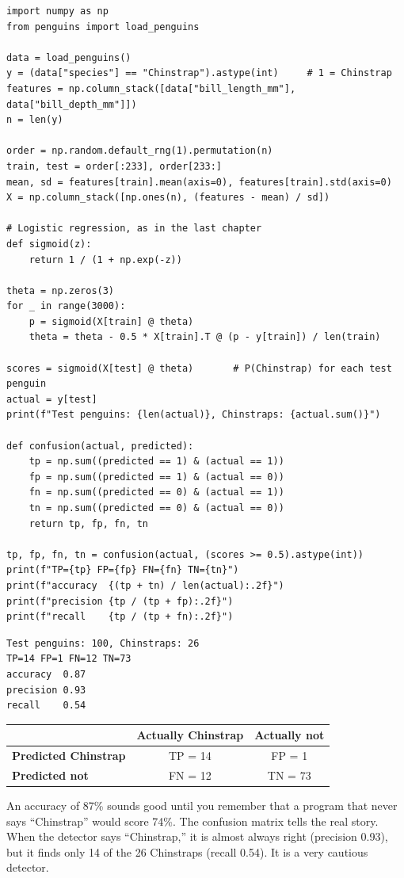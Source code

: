 \begin{verbatim}
import numpy as np
from penguins import load_penguins

data = load_penguins()
y = (data["species"] == "Chinstrap").astype(int)     # 1 = Chinstrap
features = np.column_stack([data["bill_length_mm"], data["bill_depth_mm"]])
n = len(y)

order = np.random.default_rng(1).permutation(n)
train, test = order[:233], order[233:]
mean, sd = features[train].mean(axis=0), features[train].std(axis=0)
X = np.column_stack([np.ones(n), (features - mean) / sd])

# Logistic regression, as in the last chapter
def sigmoid(z):
    return 1 / (1 + np.exp(-z))

theta = np.zeros(3)
for _ in range(3000):
    p = sigmoid(X[train] @ theta)
    theta = theta - 0.5 * X[train].T @ (p - y[train]) / len(train)

scores = sigmoid(X[test] @ theta)       # P(Chinstrap) for each test penguin
actual = y[test]
print(f"Test penguins: {len(actual)}, Chinstraps: {actual.sum()}")

def confusion(actual, predicted):
    tp = np.sum((predicted == 1) & (actual == 1))
    fp = np.sum((predicted == 1) & (actual == 0))
    fn = np.sum((predicted == 0) & (actual == 1))
    tn = np.sum((predicted == 0) & (actual == 0))
    return tp, fp, fn, tn

tp, fp, fn, tn = confusion(actual, (scores >= 0.5).astype(int))
print(f"TP={tp} FP={fp} FN={fn} TN={tn}")
print(f"accuracy  {(tp + tn) / len(actual):.2f}")
print(f"precision {tp / (tp + fp):.2f}")
print(f"recall    {tp / (tp + fn):.2f}")
\end{verbatim}

\begin{verbatim}
Test penguins: 100, Chinstraps: 26
TP=14 FP=1 FN=12 TN=73
accuracy  0.87
precision 0.93
recall    0.54
\end{verbatim}

\begin{center}
\begin{tabular}{l c c}
 & \textbf{Actually Chinstrap} & \textbf{Actually not} \\
\hline
\textbf{Predicted Chinstrap} & TP = 14 & FP = 1 \\
\textbf{Predicted not} & FN = 12 & TN = 73 \\
\end{tabular}
\end{center}

An accuracy of 87\% sounds good until you remember that a program that never says ``Chinstrap'' would score
74\%. The confusion matrix tells the real story. When the detector says ``Chinstrap,'' it is almost always
right (precision 0.93), but it finds only 14 of the 26 Chinstraps (recall 0.54). It is a very cautious detector.

